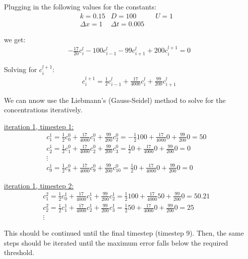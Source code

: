 \documentclass{article}
\begin{document}
Plugging in the following values for the constants:
\begin{align*}
  &k = 0.15 &D = 100 &&U = 1 &&\\
  &\Delta x = 1 &\Delta t = 0.005
\end{align*}

we get:
\begin{align*}
  -\frac{17}{20} c_{i}^{l} 
  -
  100 c_{i-1}^{l}
  -
  99 c_{i+1}^{l}
  +
  200 c_{i}^{l+1}
  =
  0
\end{align*}

Solving for $c_{i}^{l+1}$:
\begin{align*}
  c_{i}^{l+1}
  =
  \frac{1}{2} c_{i-1}^{l}
  +
  \frac{17}{4000} c_{i}^{l} 
  +
  \frac{99}{200} c_{i+1}^{l}
\end{align*}

We can nnow use the Liebmann's (Gauss-Seidel) method to solve for the concentrations iteratively.

\underline{iteration 1, timestep 1:}
\begin{align*}
  &c_{1}^{1}
  =
  \frac{1}{2} c_{0}^{0}
  +
  \frac{17}{4000} c_{1}^{0} 
  +
  \frac{99}{200} c_{2}^{0}
  =
  -\frac{1}{2} 100
  +
  \frac{17}{4000} 0
  +
  \frac{99}{200} 0
  =
  50 &&\\
  &c_{2}^{1}
  =
  \frac{1}{2} c_{1}^{0}
  +
  \frac{17}{4000} c_{2}^{0} 
  +
  \frac{99}{200} c_{3}^{0}
  =
  \frac{1}{2} 0
  +
  \frac{17}{4000} 0
  +
  \frac{99}{200} 0
  =
  0 &&\\
  &\vdots &&\\
  &c_{9}^{1}
  =
  \frac{1}{2} c_{8}^{0}
  +
  \frac{17}{4000} c_{9}^{0} 
  +
  \frac{99}{200} c_{10}^{0}
  = 
  \frac{1}{2} 0
  +
  \frac{17}{4000} 0
  +
  \frac{99}{200} 0
  = 0
\end{align*}

\underline{iteration 1, timestep 2:}
\begin{align*}
  &c_{1}^{2}
  =
  \frac{1}{2} c_{0}^{1}
  +
  \frac{17}{4000} c_{1}^{1} 
  +
  \frac{99}{200} c_{2}^{1}
  =
  \frac{1}{2} 100
  +
  \frac{17}{4000} 50
  +
  \frac{99}{200} 0
  =
  50.21 &&\\
  &c_{2}^{2}
  =
  \frac{1}{2} c_{1}^{1}
  +
  \frac{17}{4000} c_{2}^{1} 
  +
  \frac{99}{200} c_{3}^{1}
  =
  \frac{1}{2} 50
  +
  \frac{17}{4000} 0
  +
  \frac{99}{200} 0
  =
  25 &&\\
  &\vdots
\end{align*}

This should be continued until the final timestep (timestep 9). Then, the same steps should be iterated until the maximum error falls below the required threshold.
\end{document}
